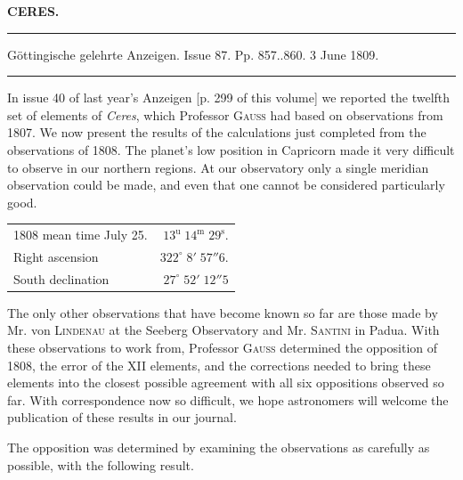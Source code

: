 \clearpage
{}
\hypertarget{native-317-lower}{}
\begin{center}
\textbf{CERES.}
\par\vspace{4pt}\hrule\vspace{4pt}
\fontsize{10}{12}\selectfont Göttingische gelehrte Anzeigen. Issue 87. Pp. 857..860. 3 June 1809.
\par\vspace{4pt}\hrule\vspace{4pt}
\end{center}

\par\indent In issue 40 of last year’s Anzeigen [p. 299 of this volume] we reported the twelfth set of elements of \emph{Ceres}, which Professor \textsc{Gauss} had based on observations from 1807. We now present the results of the calculations just completed from the observations of 1808. The planet’s low position in Capricorn made it very difficult to observe in our northern regions. At our observatory only a single meridian observation could be made, and even that one cannot be considered particularly good.


\begin{center}\fontsize{10}{12}\selectfont\setlength{\tabcolsep}{5pt}\renewcommand{\arraystretch}{1.15}\begin{tabular}{lr} 1808 mean time July 25. & $13^{\text{u}}\;14^{\text{m}}\;29^{\text{s}}$.\\ Right ascension & $322^\circ\;8'\;57''6$.\\ South declination & $27^\circ\;52'\;12''5$\\
\end{tabular}\end{center}


\par\indent The only other observations that have become known so far are those made by Mr. von \textsc{Lindenau} at the Seeberg Observatory and Mr. \textsc{Santini} in Padua. With these observations to work from, Professor \textsc{Gauss} determined the opposition of 1808, the error of the XII elements, and the corrections needed to bring these elements into the closest possible agreement with all six oppositions observed so far. With correspondence now so difficult, we hope astronomers will welcome the publication of these results in our journal.

\par\indent The opposition was determined by examining the observations as carefully as possible, with the following result.


